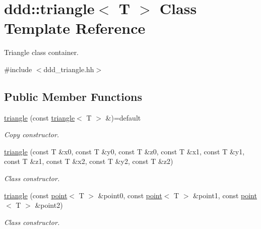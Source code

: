 \hypertarget{classddd_1_1triangle}{}\section{ddd\+:\+:triangle$<$ T $>$ Class Template Reference}
\label{classddd_1_1triangle}


Triangle class container.  




{\ttfamily \#include $<$ddd\+\_\+triangle.\+hh$>$}

\subsection*{Public Member Functions}
\begin{DoxyCompactItemize}
\item 
\mbox{\label{classddd_1_1triangle_a3f1ab930b26ec606d8979a9c191a2722}} 
\hyperlink{classddd_1_1triangle_a3f1ab930b26ec606d8979a9c191a2722}{triangle} (const \hyperlink{classddd_1_1triangle}{triangle}$<$ T $>$ \&)=default
\begin{DoxyCompactList}\small\item\em Copy constructor. \end{DoxyCompactList}\item 
\mbox{\label{classddd_1_1triangle_ad19b3fc3d0a7997a6ab0400901743190}} 
\hyperlink{classddd_1_1triangle_ad19b3fc3d0a7997a6ab0400901743190}{triangle} (const T \&x0, const T \&y0, const T \&z0, const T \&x1, const T \&y1, const T \&z1, const T \&x2, const T \&y2, const T \&z2)
\begin{DoxyCompactList}\small\item\em Class constructor. \end{DoxyCompactList}\item 
\hyperlink{classddd_1_1triangle_afca480ce032f9e6ba7058c6817374ef8}{triangle} (const \hyperlink{classddd_1_1point}{point}$<$ T $>$ \&point0, const \hyperlink{classddd_1_1point}{point}$<$ T $>$ \&point1, const \hyperlink{classddd_1_1point}{point}$<$ T $>$ \&point2)
\begin{DoxyCompactList}\small\item\em Class constructor. \end{DoxyCompactList}\item 
\mbox{\label{classddd_1_1triangle_ae17a51e842e44cfb3061bdca7e64bc11}} 

\end{DoxyCompactItemize}
